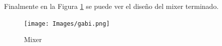 \documentclass[a4paper,10pt]{article}
\begin{document}
	Finalmente en la Figura \ref{ecuadorputa} se puede ver el dise\~no del mixer terminado. 
	
		\begin{figure}[!htb]
			\centering
			\texttt{[image: Images/gabi.png]}
			\caption{Mixer}
			\label{ecuadorputa}
		\end{figure}
\end{document}
